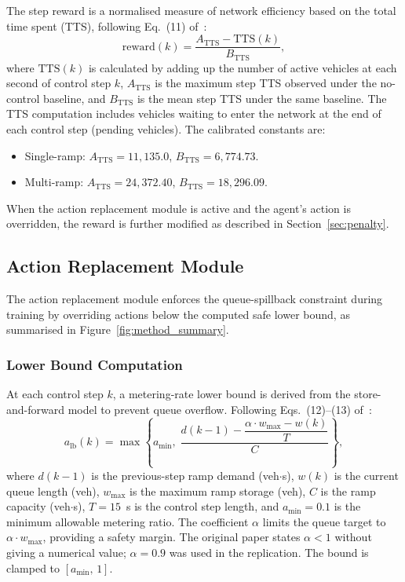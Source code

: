     The step reward is a normalised measure of network efficiency based on the total time spent (TTS), following Eq.~(11) of~\cite{Yang2025Reinforcement}:
    \[
    \text{reward}(k) = \frac{A_{\mathrm{TTS}} - \mathrm{TTS}(k)}{B_{\mathrm{TTS}}},
    \]
    where $\mathrm{TTS}(k)$ is calculated by adding up the number of active vehicles at each second of control step $k$, $A_{\mathrm{TTS}}$ is the maximum step TTS observed under the no-control baseline, and $B_{\mathrm{TTS}}$ is the mean step TTS under the same baseline. The TTS computation includes vehicles waiting to enter the network at the end of each control step (pending vehicles). The calibrated constants are:


    \begin{itemize}
        \item Single-ramp: $A_{\mathrm{TTS}} = 11{,}135.0$, $B_{\mathrm{TTS}} = 6{,}774.73$.
        \item Multi-ramp: $A_{\mathrm{TTS}} = 24{,}372.40$, $B_{\mathrm{TTS}} = 18{,}296.09$.
    \end{itemize}

    When the action replacement module is active and the agent's action is overridden, the reward is further modified as described in Section~\ref{sec:penalty}.


\subsection{Action Replacement Module}

The action replacement module enforces the queue-spillback constraint during training by overriding actions below the computed safe lower bound, as summarised in Figure~\ref{fig:method_summary}.

\subsubsection{Lower Bound Computation}

At each control step $k$, a metering-rate lower bound is derived from the store-and-forward model to prevent queue overflow. Following Eqs.~(12)--(13) of~\cite{Yang2025Reinforcement}:
\[
a_{\mathrm{lb}}(k) = \max\!\left\{ a_{\min},\; \frac{d(k-1) - \dfrac{\alpha \cdot w_{\max} - w(k)}{T}}{C} \right\},
\]
where $d(k-1)$ is the previous-step ramp demand (veh$\cdot$s), $w(k)$ is the current queue length (veh), $w_{\max}$ is the maximum ramp storage (veh), $C$ is the ramp capacity (veh$\cdot$s), $T = 15$~s is the control step length, and $a_{\min} = 0.1$ is the minimum allowable metering ratio. The coefficient $\alpha$ limits the queue target to $\alpha \cdot w_{\max}$, providing a safety margin. The original paper states $\alpha < 1$ without giving a numerical value; $\alpha = 0.9$ was used in the replication. The bound is clamped to $[a_{\min},\, 1]$.

